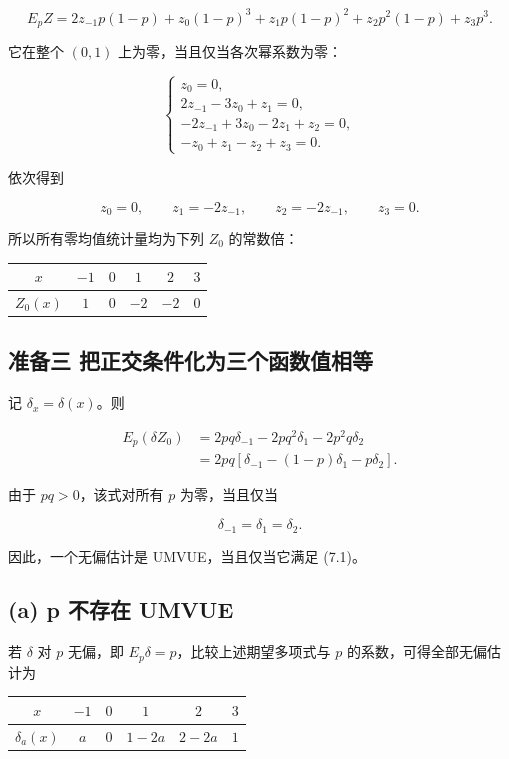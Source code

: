 \[
E_pZ=2z_{-1}p(1-p)+z_0(1-p)^3
+z_1p(1-p)^2+z_2p^2(1-p)+z_3p^3.
\]

它在整个 $(0,1)$ 上为零，当且仅当各次幂系数为零：

\[
\begin{cases}
z_0=0,\\
2z_{-1}-3z_0+z_1=0,\\
-2z_{-1}+3z_0-2z_1+z_2=0,\\
-z_0+z_1-z_2+z_3=0.
\end{cases}
\]

依次得到

\[
z_0=0,\qquad z_1=-2z_{-1},\qquad
z_2=-2z_{-1},\qquad z_3=0.
\]

所以所有零均值统计量均为下列 $Z_0$ 的常数倍：

\begin{center}
\begin{tabular}{cccccc}
\toprule
$x$ & $-1$ & $0$ & $1$ & $2$ & $3$ \\
\midrule
$Z_0(x)$ & $1$ & $0$ & $-2$ & $-2$ & $0$ \\
\bottomrule
\end{tabular}
\end{center}

\subsection{准备三 把正交条件化为三个函数值相等}

记 $\delta_x=\delta(x)$。则

\[
\begin{aligned}
E_p(\delta Z_0)
&=2pq\delta_{-1}-2pq^2\delta_1-2p^2q\delta_2\\
&=2pq[\delta_{-1}-(1-p)\delta_1-p\delta_2].
\end{aligned}
\]

由于 $pq>0$，该式对所有 $p$ 为零，当且仅当

\[
\boxed{\delta_{-1}=\delta_1=\delta_2.}
\tag{7.1}
\]

因此，一个无偏估计是 UMVUE，当且仅当它满足 (7.1)。

\subsection{(a) p 不存在 UMVUE}

若 $\delta$ 对 $p$ 无偏，即 $E_p\delta=p$，比较上述期望多项式与 $p$ 的系数，可得全部无偏估计为

\begin{center}
\begin{tabular}{cccccc}
\toprule
$x$ & $-1$ & $0$ & $1$ & $2$ & $3$ \\
\midrule
$\delta_a(x)$ & $a$ & $0$ & $1-2a$ & $2-2a$ & $1$ \\
\bottomrule
\end{tabular}
\end{center}

